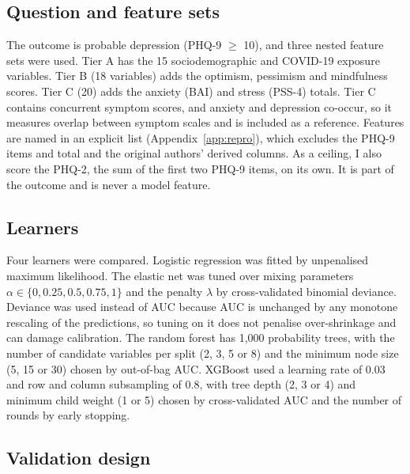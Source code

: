 \subsection{Question and feature sets}
The outcome is probable depression (PHQ-9 $\geq$ 10), and three nested feature sets were used. Tier A has the 15 sociodemographic and COVID-19 exposure variables. Tier B (18 variables) adds the optimism, pessimism and mindfulness scores. Tier C (20) adds the anxiety (BAI) and stress (PSS-4) totals. Tier C contains concurrent symptom scores, and anxiety and depression co-occur, so it measures overlap between symptom scales and is included as a reference. Features are named in an explicit list (Appendix~\ref{app:repro}), which excludes the PHQ-9 items and total and the original authors' derived columns. As a ceiling, I also score the PHQ-2, the sum of the first two PHQ-9 items, on its own. It is part of the outcome and is never a model feature.

\subsection{Learners}
Four learners were compared. Logistic regression was fitted by unpenalised maximum likelihood. The elastic net \parencite{zou2005,friedman2010} was tuned over mixing parameters $\alpha \in \{0, 0.25, 0.5, 0.75, 1\}$ and the penalty $\lambda$ by cross-validated binomial deviance. Deviance was used instead of AUC because AUC is unchanged by any monotone rescaling of the predictions, so tuning on it does not penalise over-shrinkage and can damage calibration. The random forest \parencite{breiman2001,wright2017} has 1,000 probability trees, with the number of candidate variables per split (2, 3, 5 or 8) and the minimum node size (5, 15 or 30) chosen by out-of-bag AUC. XGBoost \parencite{chen2016} used a learning rate of 0.03 and row and column subsampling of 0.8, with tree depth (2, 3 or 4) and minimum child weight (1 or 5) chosen by cross-validated AUC and the number of rounds by early stopping.

\subsection{Validation design}
